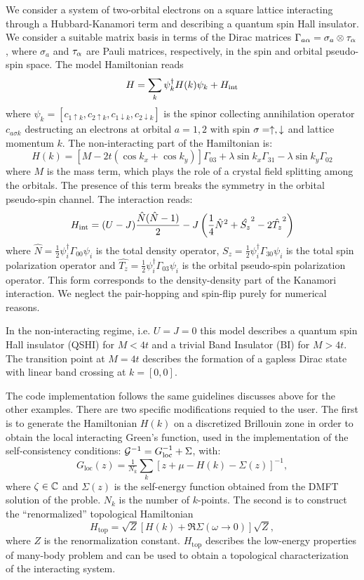 \documentclass[edipack_sp.tex]{subfiles}
\begin{document}
We consider a system of two-orbital electrons on a square
lattice interacting through a Hubbard-Kanamori term and describing
a quantum spin Hall insulator.
We consider a suitable matrix basis in terms of the Dirac
matrices $\Gamma_{a\alpha}=\sigma_a\otimes \tau_\alpha$, where $\sigma_a$ and
$\tau_\alpha$ are Pauli matrices, respectively, in the spin and orbital
pseudo-spin space. The  model Hamiltonian reads
$$
H = \sum_{k}\psi_{k}^\dagger H(k)\psi_{k} + H_{\rm int}
$$
where $\psi_{k}=[c_{1\uparrow k}, c_{2\uparrow k},
c_{1\downarrow k}, c_{2\downarrow k} ]$ is the spinor collecting
annihilation operator $c_{a\sigma k}$ destructing an electrons at
orbital $a=1,2$ with spin  $\sigma=\uparrow,\downarrow$ and lattice momentum
$k$. The non-interacting part of the Hamiltonian is:
$$
H(k) = \left[M-2t(\cos{k_x}+\cos{k_y}) \right]\Gamma_{03} +
   \lambda\sin{k_x}\Gamma_{31} -   \lambda\sin{k_y}\Gamma_{02}
$$
where $M$ is the mass term, which plays the role of a crystal
field splitting among the orbitals. The presence of this term breaks
the symmetry in the orbital pseudo-spin channel.
The  interaction reads: 
$$
   H_{\rm int} = (U-J)\frac{\hat{N}(\hat{N}-1)}{2} - J\left( \frac{1}{4}\hat{N}^2 +
   \hat{S_z}^2 - 2 \hat{T_z}^2\right)
 $$
 where $\hat{N}=\tfrac{1}{2}\psi_i^\dagger \Gamma_{00}\psi_i$ is the
total density operator,
$\hat{S_z}=\tfrac{1}{2}\psi_i^\dagger \Gamma_{30}\psi_i$ is the total
spin polarization operator and $\hat{T_z}=\tfrac{1}{2}\psi_i^\dagger
\Gamma_{03}\psi_i$ is the orbital pseudo-spin polarization operator.
This form corresponds to the density-density part of the
Kanamori interaction. We neglect the pair-hopping and spin-flip purely
for numerical reasons. 

In the non-interacting regime, i.e. $U=J=0$ this model describes a
quantum spin Hall insulator (QSHI) for $M<4t$ and a trivial Band
Insulator (BI) for $M>4t$.
The transition point at $M=4t$ describes the formation of a gapless
Dirac state with linear band crossing at $k=[0,0]$.  


The code implementation follows the same guidelines discusses above
for the other examples. There are two specific modifications requied
to the  user. The first is to generate the Hamiltonian $H(k)$ on a discretized Brillouin zone in
order to obtain the local interacting Green's function, used in the
implementation of the self-consistency conditions:
${\cal G}^{-1}=G_\mathrm{loc}^{-1}+\Sigma$, with: 
$$
G_\mathrm{loc}(z) = \tfrac{1}{N_k}\sum_k \left[z+\mu-H(k)-\Sigma(z)
\right]^{-1}, 
$$
where $\zeta\in\mathbb{C}$  and $\Sigma(z)$ is the self-energy function obtained from the DMFT
solution of the proble.  $N_k$ is the number of $k$-points. 
The second is to  construct the ``renormalized'' topological
Hamiltonian
$$
H_\mathrm{top} = \sqrt{Z}[H(k) + \Re\Sigma(\omega\to0)]\sqrt{Z}, 
$$
where $Z$ is the renormalization constant. $H_\mathrm{top}$ describes the
low-energy properties of many-body problem and can be used to obtain a 
topological characterization of the interacting system.  
\end{document}
